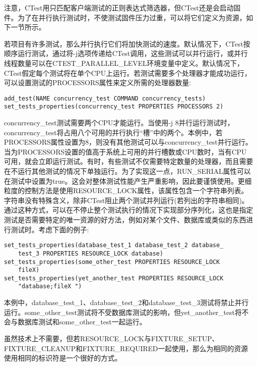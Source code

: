 注意，CTest用只匹配客户端测试的正则表达式筛选器，但CTest还是会启动固件。为了在并行执行测试时，不使测试固件压力过重，可以将它们定义为资源，如下一节所示。


若项目有许多测试，那么并行执行它们将加快测试的速度。默认情况下，CTest按顺序运行测试，通过将-j选项传递给CTest调用，这些测试可以并行运行，或并行线程数量可以在CTEST\_PARALLEL\_LEVEL环境变量中定义。默认情况下，CTest假定每个测试将在单个CPU上运行。若测试需要多个处理器才能成功运行，可以设置测试的PROCESSORS属性来定义所需的处理器数量:

\begin{lstlisting}[style=styleCMake]
add_test(NAME concurrency_test COMMAND concurrency_tests)
set_tests_properties(concurrency_test PROPERTIES PROCESSORS 2)
\end{lstlisting}

concurrency\_test测试需要两个CPU才能运行。当使用-j 8并行运行测试时，concurrency\_test将占用八个可用的并行执行“槽”中的两个。本例中，若PROCESSORS属性设置为8，则没有其他测试可以与concurrency\_test并行运行。当为PROCESSORS设置的值高于系统上可用的并行槽数或CPU数时，当有CPU可用，就会立即运行测试。有时，有些测试不仅需要特定数量的处理器，而且需要在不运行其他测试的情况下单独运行。为了实现这一点，RUN\_SERIAL属性可以在测试中设置为true。这会对整体测试性能产生严重影响，因此要谨慎使用。更细粒度的控制方法是使用RESOURCE\_LOCK属性，该属性包含一个字符串列表。字符串没有特殊含义，除非CTest阻止两个测试并列运行(若列出的字符串相同)。通过这种方式，可以在不停止整个测试执行的情况下实现部分序列化，这也是指定测试是否需要特定的唯一资源的好方法，例如对某个文件、数据库或类似的东西进行测试时。考虑下面的例子:

\begin{lstlisting}[style=styleCMake]
set_tests_properties(database_test_1 database_test_2 database_
	test_3 PROPERTIES RESOURCE_LOCK database)
set_tests_properties(some_other_test PROPERTIES RESOURCE_LOCK
	fileX)
set_tests_properties(yet_another_test PROPERTIES RESOURCE_LOCK
	"database;fileX ")
\end{lstlisting}

本例中，database\_test\_1、database\_test\_2和database\_test\_3测试将禁止并行运行。some\_other\_test测试将不受数据库测试的影响，但yet\_another\_test将不会与数据库测试和some\_other\_test一起运行。

\begin{tcolorbox}[colback=blue!5!white,colframe=blue!75!black,title=固件为源]
虽然技术上不需要，但若RESOURCE\_LOCK与FIXTURE\_SETUP、FIXTURE\_CLEANUP和FIXTURE\_REQUIRED一起使用，那么为相同的资源使用相同的标识符是一个很好的方式。
\end{tcolorbox}

